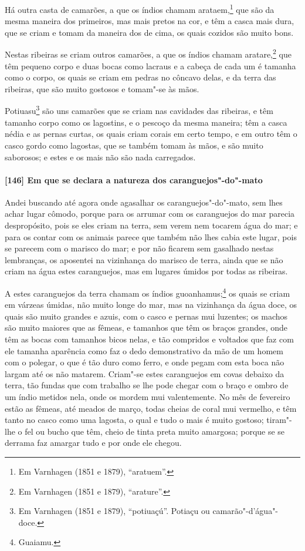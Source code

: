 Há outra casta de camarões, a que os índios chamam arataem,\footnote{ Em Varnhagen (1851 e
1879), ``aratuem''.} que são da mesma maneira dos primeiros, mas mais pretos na cor, e
têm a casca mais dura, que se criam e tomam da maneira dos de cima, os quais cozidos são
muito bons.

Nestas ribeiras se criam outros camarões, a que os índios chamam aratare,\footnote{ Em
Varnhagen (1851 e 1879), ``arature''.} que têm pequeno corpo e duas bocas como lacraus e
a cabeça de cada um é tamanha como o corpo, os quais se criam em pedras no côncavo delas,
e da terra das ribeiras, que são muito gostosos e tomam"-se às mãos.

Potiuasu\footnote{ Em Varnhagen (1851 e 1879), ``potiuaçú''. Potiaçu ou
camarão"-d'água"-doce.} são uns camarões que se criam nas cavidades das ribeiras, e têm
tamanho corpo como os lagostins, e o pescoço da mesma maneira; têm a casca nédia e as
pernas curtas, os quais criam corais em certo tempo, e em outro têm o casco gordo como
lagostas, que se também tomam às mãos, e são muito saborosos; e estes e os mais não são
nada carregados.

\paragraph{[146] Em que se declara a natureza dos caranguejos"-do"-mato}\quad
Andei buscando até agora onde agasalhar os caranguejos"-do"-mato, sem lhes achar lugar
cômodo, porque para os arrumar com os caranguejos do mar parecia despropósito, pois se
eles criam na terra, sem verem nem tocarem água do mar; e para os contar com os animais
parece que também não lhes cabia este lugar, pois se parecem com o marisco do mar; e por
não ficarem sem gasalhado nestas lembranças, os aposentei na vizinhança do marisco de
terra, ainda que se não criam na água estes caranguejos, mas em lugares úmidos por todas
as ribeiras.

A estes caranguejos da terra chamam os índios guoanhamus;\footnote{ Guaiamu.} os quais se
criam em várzeas úmidas, não muito longe do mar, mas na vizinhança da água doce, os quais
são muito grandes e azuis, com o casco e pernas mui luzentes; os machos são muito maiores
que as fêmeas, e tamanhos que têm os braços grandes, onde têm as bocas com tamanhos bicos
nelas, e tão compridos e voltados que faz com ele tamanha aparência como faz o dedo
demonstrativo da mão de um homem com o polegar, o que é tão duro como ferro, e onde pegam
com esta boca não largam até os não matarem. Criam"-se estes caranguejos em covas debaixo
da terra, tão fundas que com trabalho se lhe pode chegar com o braço e ombro de um índio
metidos nela, onde os mordem mui valentemente. No mês de fevereiro estão as fêmeas, até
meados de março, todas cheias de coral mui vermelho, e têm tanto no casco como uma
lagosta, o qual e tudo o mais é muito gostoso; tiram"-lhe o fel ou bucho que têm, cheio de
tinta preta muito amargosa; porque se se derrama faz amargar tudo e por onde ele chegou.

